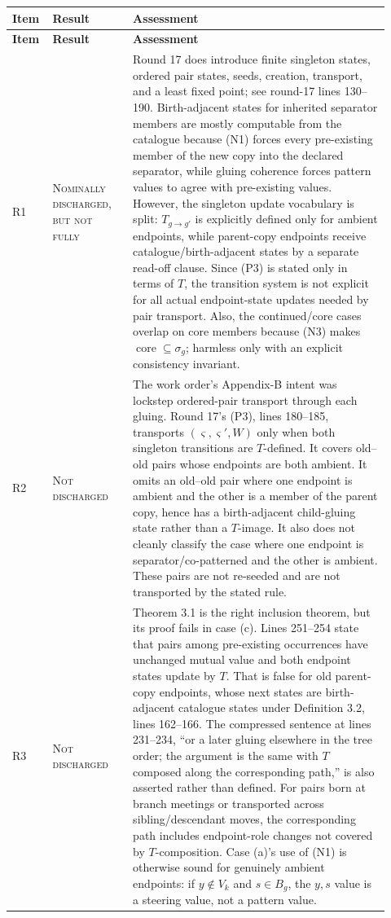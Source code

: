 \documentclass[11pt]{article}
\newcommand{\core}{\operatorname{core}}
\newcommand{\status}[1]{\textsc{#1}}
\begin{document}
\begin{longtable}{>{\raggedright\arraybackslash}p{0.08\linewidth} >{\raggedright\arraybackslash}p{0.20\linewidth} >{\raggedright\arraybackslash}p{0.64\linewidth}}
\toprule
\textbf{Item} & \textbf{Result} & \textbf{Assessment} \\
\midrule
\endfirsthead
\toprule
\textbf{Item} & \textbf{Result} & \textbf{Assessment} \\
\midrule
\endhead
\bottomrule
\endfoot
R1 & \status{Nominally discharged, but not fully} & Round 17 does introduce finite singleton states, ordered pair states, seeds, creation, transport, and a least fixed point; see round-17 lines 130--190.  Birth-adjacent states for inherited separator members are mostly computable from the catalogue because (N1) forces every pre-existing member of the new copy into the declared separator, while gluing coherence forces pattern values to agree with pre-existing values.  However, the singleton update vocabulary is split: $T_{g\to g'}$ is explicitly defined only for ambient endpoints, while parent-copy endpoints receive catalogue/birth-adjacent states by a separate read-off clause.  Since (P3) is stated only in terms of $T$, the transition system is not explicit for all actual endpoint-state updates needed by pair transport.  Also, the continued/core cases overlap on core members because (N3) makes $\core\subseteq\sigma_g$; harmless only with an explicit consistency invariant. \\
\addlinespace
R2 & \status{Not discharged} & The work order's Appendix-B intent was lockstep ordered-pair transport through each gluing.  Round 17's (P3), lines 180--185, transports $(\varsigma,\varsigma',W)$ only when both singleton transitions are $T$-defined.  It covers old--old pairs whose endpoints are both ambient.  It omits an old--old pair where one endpoint is ambient and the other is a member of the parent copy, hence has a birth-adjacent child-gluing state rather than a $T$-image.  It also does not cleanly classify the case where one endpoint is separator/co-patterned and the other is ambient.  These pairs are not re-seeded and are not transported by the stated rule. \\
\addlinespace
R3 & \status{Not discharged} & Theorem 3.1 is the right inclusion theorem, but its proof fails in case (c).  Lines 251--254 state that pairs among pre-existing occurrences have unchanged mutual value and both endpoint states update by $T$.  That is false for old parent-copy endpoints, whose next states are birth-adjacent catalogue states under Definition 3.2, lines 162--166.  The compressed sentence at lines 231--234, ``or a later gluing elsewhere in the tree order; the argument is the same with $T$ composed along the corresponding path,'' is also asserted rather than defined.  For pairs born at branch meetings or transported across sibling/descendant moves, the corresponding path includes endpoint-role changes not covered by $T$-composition.  Case (a)'s use of (N1) is otherwise sound for genuinely ambient endpoints: if $y\notin V_k$ and $s\in B_g$, the $y,s$ value is a steering value, not a pattern value. \\

\end{longtable}
\end{document}
